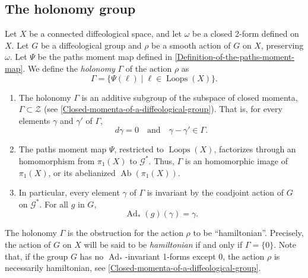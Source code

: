 \documentclass[10pt,reqno,twoside]{amsart}
\newcommand{\qmbox}[1]{\quad\mbox{#1}\quad}
\newcommand{\cG}{\mathcal{G}}
\newcommand{\cZ}{\mathcal{Z}}
\DeclareMathOperator{\Ab}{Ab}
\DeclareMathOperator{\Ad}{Ad}
\DeclareMathOperator{\Loops}{Loops}
\theoremstyle{plain}
\theoremstyle{definition}
\newcommand{\article}[1]{\subsection{#1}}
\begin{document}
  \article{The holonomy group}
  \label{The-holonomy-group}
  Let $X$ be a connected diffeological space,
  and let $\omega$ be a closed 2-form defined on $X$.
  Let $G$ be a diffeological group and $\rho$ be a smooth action of $G$ on $X$,
  preserving $\omega$.
  Let $\Psi$ be the paths moment map defined in \ref{Definition-of-the-paths-moment-map}.
  We define the {\em holonomy} $\Gamma$ of the action $\rho$ as
  $$
    \Gamma = \{ \Psi(\ell) \mid \ell \in \Loops(X) \}.
    $$
  \begin{enumerate}
    \item The holonomy $\Gamma$ is an additive subgroup of the subspace of closed momenta, $\Gamma \subset \cZ$ (see \ref{Closed-momenta-of-a-diffeological-group}). That is, for every elements $\gamma$ and $\gamma'$ of $\Gamma$,
    $$
      d\gamma = 0 \qmbox{and} \gamma - \gamma' \in \Gamma.
      $$
    \item The paths moment map $\Psi$, restricted to $\Loops(X)$, factorizes through an homomorphism from $\pi_1(X)$ to $\cG^*$. Thus, $\Gamma$ is an homomorphic image of $\pi_1(X)$, or its abelianized $\Ab(\pi_1(X))$.
    \item In particular, every element $\gamma$ of $\Gamma$ is invariant by the coadjoint action of $G$ on $\cG^*$. For all $g$ in $G$,
    $$
      \Ad_*(g)(\gamma) = \gamma.
      $$
  \end{enumerate}
  The holonomy $\Gamma$ is the obstruction for the action $\rho$ to be ``hamiltonian''.
  Precisely,
  the action of $G$ on $X$ will be said to be {\em hamiltonian} if and only if $\Gamma = \{0\}$.
  Note that,
  if the group $G$ has no $\Ad_*$-invariant 1-forms except 0,
  the action $\rho$ is necessarily hamiltonian,
  see \ref{Closed-momenta-of-a-diffeological-group}.
  
\end{document}
